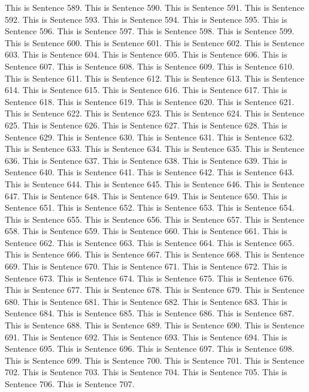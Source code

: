 \documentclass{article}
\begin{document}
This is Sentence 589.
This is Sentence 590.
This is Sentence 591.
This is Sentence 592.
This is Sentence 593.
This is Sentence 594.
This is Sentence 595.
This is Sentence 596.
This is Sentence 597.
This is Sentence 598.
This is Sentence 599.
This is Sentence 600.
This is Sentence 601.
This is Sentence 602.
This is Sentence 603.
This is Sentence 604.
This is Sentence 605.
This is Sentence 606.
This is Sentence 607.
This is Sentence 608.
This is Sentence 609.
This is Sentence 610.
This is Sentence 611.
This is Sentence 612.
This is Sentence 613.
This is Sentence 614.
This is Sentence 615.
This is Sentence 616.
This is Sentence 617.
This is Sentence 618.
This is Sentence 619.
This is Sentence 620.
This is Sentence 621.
This is Sentence 622.
This is Sentence 623.
This is Sentence 624.
This is Sentence 625.
This is Sentence 626.
This is Sentence 627.
This is Sentence 628.
This is Sentence 629.
This is Sentence 630.
This is Sentence 631.
This is Sentence 632.
This is Sentence 633.
This is Sentence 634.
This is Sentence 635.
This is Sentence 636.
This is Sentence 637.
This is Sentence 638.
This is Sentence 639.
This is Sentence 640.
This is Sentence 641.
This is Sentence 642.
This is Sentence 643.
This is Sentence 644.
This is Sentence 645.
This is Sentence 646.
This is Sentence 647.
This is Sentence 648.
This is Sentence 649.
This is Sentence 650.
This is Sentence 651.
This is Sentence 652.
This is Sentence 653.
This is Sentence 654.
This is Sentence 655.
This is Sentence 656.
This is Sentence 657.
This is Sentence 658.
This is Sentence 659.
This is Sentence 660.
This is Sentence 661.
This is Sentence 662.
This is Sentence 663.
This is Sentence 664.
This is Sentence 665.
This is Sentence 666.
This is Sentence 667.
This is Sentence 668.
This is Sentence 669.
This is Sentence 670.
This is Sentence 671.
This is Sentence 672.
This is Sentence 673.
This is Sentence 674.
This is Sentence 675.
This is Sentence 676.
This is Sentence 677.
This is Sentence 678.
This is Sentence 679.
This is Sentence 680.
This is Sentence 681.
This is Sentence 682.
This is Sentence 683.
This is Sentence 684.
This is Sentence 685.
This is Sentence 686.
This is Sentence 687.
This is Sentence 688.
This is Sentence 689.
This is Sentence 690.
This is Sentence 691.
This is Sentence 692.
This is Sentence 693.
This is Sentence 694.
This is Sentence 695.
This is Sentence 696.
This is Sentence 697.
This is Sentence 698.
This is Sentence 699.
This is Sentence 700.
This is Sentence 701.
This is Sentence 702.
This is Sentence 703.
This is Sentence 704.
This is Sentence 705.
This is Sentence 706.
This is Sentence 707.
\end{document}
